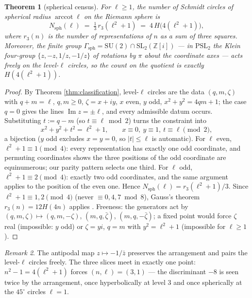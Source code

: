 \documentclass[11pt]{amsart}
\numberwithin{equation}{section}
\theoremstyle{plain}
\newtheorem{theorem}{Theorem}[section]
\theoremstyle{definition}
\theoremstyle{remark}
\newtheorem{remark}[theorem]{Remark}
\newcommand{\Z}{\mathbb{Z}}
\newcommand{\Zi}{\Z[i]}
\newcommand{\SL}{\mathrm{SL}}
\newcommand{\PSL}{\mathrm{PSL}}
\newcommand{\SU}{\mathrm{SU}}
\newcommand{\im}{\operatorname{Im}}
\newcommand{\arccot}{\operatorname{arccot}}
\begin{document}
\begin{theorem}[spherical census]\label{thm:spherical}
For $\ell \ge 1$, the number of Schmidt circles of spherical radius
$\arccot\ell$ on the Riemann sphere is
\[
  N_{\mathrm{sph}}(\ell) \;=\; \tfrac13\,r_3(\ell^2 + 1)
  \;=\; 4\,H\bigl(4(\ell^2 + 1)\bigr),
\]
where $r_3(n)$ is the number of representations of $n$ as a sum of three
squares.  Moreover, the finite group
$\Gamma_{\mathrm{sph}} = \SU(2) \cap \SL_2(\Zi)$ --- in $\PSL_2$ the
Klein four-group $\{z, -z, 1/z, -1/z\}$ of rotations by $\pi$ about the
coordinate axes --- acts freely on the level-$\ell$ circles, so the count
on the quotient is exactly $H(4(\ell^2 + 1))$.
\end{theorem}

\begin{proof}
By Theorem \ref{thm:classification}, level-$\ell$ circles are the data
$(q, m, \zeta)$ with $q + m = \ell$, $q, m \ge 0$, $\zeta = x + iy$, $x$
even, $y$ odd, $x^2 + y^2 = 4qm + 1$; the case $q = 0$ gives the lines
$\im z = \pm\ell$, and every admissible datum occurs.  Substituting
$t := q - m$ (so $t \equiv \ell \bmod 2$) turns the constraint into
\[
  x^2 + y^2 + t^2 = \ell^2 + 1, \qquad
  x \equiv 0,\ y \equiv 1,\ t \equiv \ell \pmod 2,
\]
a bijection ($y$ odd excludes $x = y = 0$, so $|t| \le \ell$ is
automatic).  For $\ell$ even, $\ell^2 + 1 \equiv 1 \pmod 4$: every
representation has exactly one odd coordinate, and permuting coordinates
shows the three positions of the odd coordinate are equinumerous; our
parity pattern selects one third.  For $\ell$ odd,
$\ell^2 + 1 \equiv 2 \pmod 4$: exactly two odd coordinates, and the same
argument applies to the position of the even one.  Hence
$N_{\mathrm{sph}}(\ell) = r_3(\ell^2 + 1)/3$.  Since
$\ell^2 + 1 \equiv 1, 2 \pmod 4$ (never $\equiv 0, 4, 7 \bmod 8$),
Gauss's theorem $r_3(n) = 12H(4n)$ applies
\cite[\S4]{Grosswald1985}.  Freeness: the generators act by
$(q, m, \zeta) \mapsto (q, m, -\zeta)$, $(m, q, \bar\zeta)$,
$(m, q, -\bar\zeta)$; a fixed point would force $\zeta$ real
(impossible: $y$ odd) or $\zeta = yi$, $q = m$ with $y^2 = \ell^2 + 1$
(impossible for $\ell \ge 1$).
\end{proof}

\begin{remark}
The antipodal map $z \mapsto -1/\bar z$ preserves the arrangement and
pairs the level-$\ell$ circles freely.  The three slices meet in exactly
one point: $n^2 - 1 = 4(\ell^2 + 1)$ forces $(n, \ell) = (3, 1)$ ---
the discriminant $-8$ is seen twice by the arrangement, once
hyperbolically at level $3$ and once spherically at the $45^\circ$
circles $\ell = 1$.
\end{remark}
\end{document}
